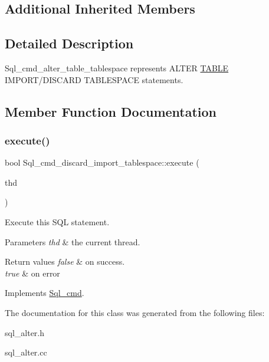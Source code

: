 \subsection*{Additional Inherited Members}


\subsection{Detailed Description}
Sql\+\_\+cmd\+\_\+alter\+\_\+table\+\_\+tablespace represents A\+L\+T\+ER \mbox{\hyperlink{structTABLE}{T\+A\+B\+LE}} I\+M\+P\+O\+R\+T/\+D\+I\+S\+C\+A\+RD T\+A\+B\+L\+E\+S\+P\+A\+CE statements. 

\subsection{Member Function Documentation}
\mbox{\label{classSql__cmd__discard__import__tablespace_a6a9f29aed00bc40b029e159b515d847d}} 
\subsubsection{\texorpdfstring{execute()}{execute()}}
{\footnotesize\ttfamily bool Sql\+\_\+cmd\+\_\+discard\+\_\+import\+\_\+tablespace\+::execute (\begin{DoxyParamCaption}\item[{T\+HD $\ast$}]{thd }\end{DoxyParamCaption})\hspace{0.3cm}{\ttfamily [virtual]}}

Execute this S\+QL statement. 
\begin{DoxyParams}{Parameters}
{\em thd} & the current thread. \\
\hline
\end{DoxyParams}

\begin{DoxyRetVals}{Return values}
{\em false} & on success. \\
\hline
{\em true} & on error \\
\hline
\end{DoxyRetVals}


Implements \mbox{\hyperlink{classSql__cmd_a213367b79b551296fbb7790f2a3732fb}{Sql\+\_\+cmd}}.



The documentation for this class was generated from the following files\+:\begin{DoxyCompactItemize}
\item 
sql\+\_\+alter.\+h\item 
sql\+\_\+alter.\+cc\end{DoxyCompactItemize}
